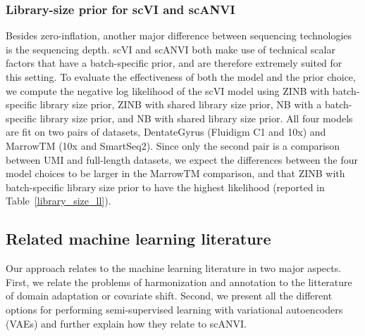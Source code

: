  
 \subsubsection{Library-size prior for scVI and scANVI}
 Besides zero-inflation, another major difference between sequencing technologies is the sequencing depth. scVI and scANVI both make use of technical scalar factors that have a batch-specific prior, and are therefore extremely suited for this setting. 
 To evaluate the effectiveness of both the model and the prior choice, we compute the negative log likelihood of the scVI model using ZINB with batch-specific library size prior, ZINB with shared library size prior, NB with a batch-specific library size prior, and NB with shared library size prior. All four models are fit on two pairs of datasets, DentateGyrus (Fluidigm C1 and 10x) and MarrowTM (10x and SmartSeq2). Since only the second pair is a comparison between UMI and full-length datasets, we expect the differences between the four model choices to be larger in the MarrowTM comparison, and that ZINB with batch-specific library size prior to have the highest likelihood (reported in Table~\ref{library_size_ll}). 




\subsection{Related machine learning literature}
Our approach relates to the machine learning literature in two major aspects. First, we relate the problems of harmonization and annotation to the litterature of domain adaptation or covariate shift. Second, we present all the different options for performing semi-supervised learning with variational autoencoders (VAEs) and further explain how they relate to scANVI.

